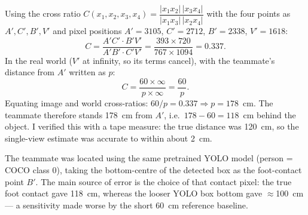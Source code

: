 \begin{enumerate}
\begin{studentSpace}
    Using the cross ratio
    $C(x_1,x_2,x_3,x_4)=\dfrac{|x_1x_2|\,|x_3x_4|}{|x_1x_3|\,|x_2x_4|}$
    with the four points as $A', C', B', V'$ and pixel positions
    $A'=3105$, $C'=2712$, $B'=2338$, $V'=1618$:
    \[
        C=\frac{A'C' \cdot B'V'}{A'B' \cdot C'V'}
         =\frac{393\times 720}{767\times 1094}=0.337.
    \]
    In the real world ($V'$ at infinity, so its terms cancel), with the
    teammate's distance from $A'$ written as $p$:
    \[
        C=\frac{60\times \infty}{p\times \infty}=\frac{60}{p}.
    \]
    Equating image and world cross-ratios:
    $60/p = 0.337 \Rightarrow p = 178$~cm. The teammate therefore stands
    178~cm from $A'$, i.e.\ $178-60 = 118$~cm behind the object. I verified
    this with a tape measure: the true distance was 120~cm, so the
    single-view estimate was accurate to within about 2~cm.

    The teammate was located using the same pretrained YOLO model
    (person = COCO class 0), taking the bottom-centre of the detected box
    as the foot-contact point $B'$. The main source of error is the choice
    of that contact pixel: the true foot contact gave 118~cm, whereas the
    looser YOLO box bottom gave $\approx$100~cm --- a sensitivity made
    worse by the short 60~cm reference baseline.
\end{studentSpace}


\end{enumerate}
